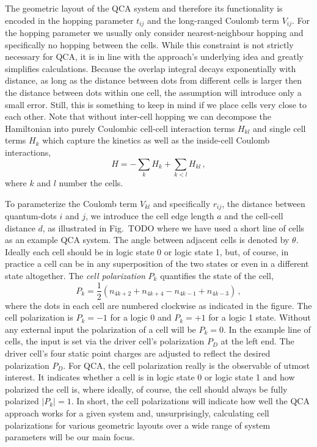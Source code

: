 The geometric layout of the QCA system and therefore its functionality is
encoded in the hopping parameter $t_{ij}$ and the long-ranged Coulomb term
$V_{ij}$. For the hopping parameter we usually only consider nearest-neighbour
hopping and specifically no hopping between the cells. While this constraint is
not strictly necessary for QCA, it is in line with the approach's underlying
idea and greatly simplifies calculations. Because the overlap integral decays
exponentially with distance, as long as the distance between dots from different
cells is larger then the distance between dots within one cell, the assumption will
introduce only a small error. Still, this is something to keep in mind if we
place cells very close to each other. Note that without inter-cell hopping we can
decompose the Hamiltonian into purely Coulombic cell-cell interaction terms
$H_{kl}$ and single cell terms $H_k$ which capture the kinetics as well as the
inside-cell Coulomb interactions,
\begin{equation}
  \label{eq:H_cell}
  H = - \sum_k H_k + \sum_{k<l} H_{kl} \, ,
\end{equation}
where $k$ and $l$ number the cells. 

To parameterize the Coulomb term $V_{kl}$ and specifically $r_{ij}$, the
distance between quantum-dots $i$ and $j$, we introduce the cell edge length $a$
and the cell-cell distance $d$, as illustrated in Fig.~TODO where we have used a
short line of cells as an example QCA system. The angle between adjacent cells
is denoted by $\theta$. Ideally each cell should be in logic state 0 or logic state 1,
but, of course, in practice a cell can be in any superposition of the two states
or even in a different state altogether. The \emph{cell polarization} $P_k$ quantifies
the state of the cell,
\begin{equation}
  \label{eq:polarization}
  P_k = \frac{1}{2} \left( n_{4k+2} + n_{4k+4} - n_{4k-1} + n_{4k-3} \right) \, ,
\end{equation}
where the dots in each cell are numbered clockwise as indicated in the figure. The
cell polarization is $P_k = -1$ for a logic 0 and $P_k = +1$ for a logic 1
state. Without any external input the polarization of a cell will be $P_k = 0$.
In the example line of cells, the input is set via the driver cell's
polarization $P_D$ at the left end. The driver cell's four static
point charges are adjusted to reflect the desired polarization $P_D$. For QCA, 
the cell polarization really is the observable of utmost interest. It indicates
whether a cell is in logic state 0 or logic state 1 and how polarized the cell
is, where ideally, of course, the cell should always be fully polarized $|P_k| =
1$. In short, the cell polarizations will indicate how well the QCA approach
works for a given system and, unsurprisingly, calculating cell polarizations for
various geometric layouts over a wide range of system parameters will be our main
focus.


